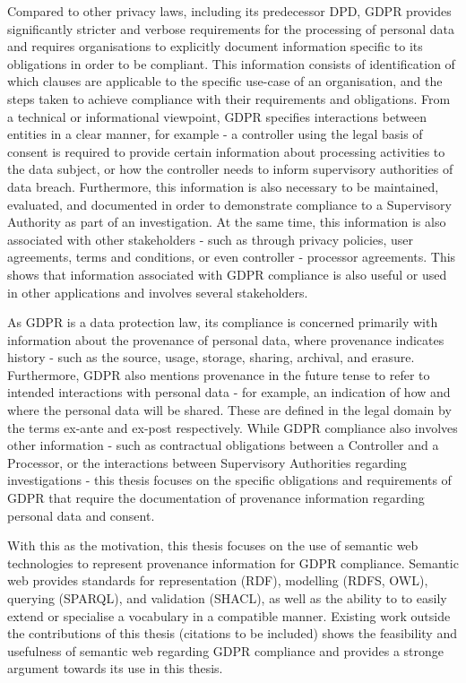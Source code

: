 Compared to other privacy laws, including its predecessor DPD, GDPR provides significantly stricter and verbose requirements for the processing of personal data and requires organisations to explicitly document information specific to its obligations in order to be compliant.
This information consists of identification of which clauses are applicable to the specific use-case of an organisation, and the steps taken to achieve compliance with their requirements and obligations.
From a technical or informational viewpoint, GDPR specifies interactions between entities in a clear manner, for example - a controller using the legal basis of consent is required to provide certain information about processing activities to the data subject, or how the controller needs to inform supervisory authorities of data breach. Furthermore, this information is also necessary to be maintained, evaluated, and documented in order to demonstrate compliance to a Supervisory Authority as part of an investigation. At the same time, this information is also associated with other stakeholders - such as through privacy policies, user agreements, terms and conditions, or even controller - processor agreements. This shows that information associated with GDPR compliance is also useful or used in other applications and involves several stakeholders.

As GDPR is a data protection law, its compliance is concerned primarily with information about the provenance of personal data, where provenance indicates history - such as the source, usage, storage, sharing, archival, and erasure. Furthermore, GDPR also mentions provenance in the future tense to refer to intended interactions with personal data - for example, an indication of how and where the personal data will be shared. These are defined in the legal domain by the terms ex-ante and ex-post respectively.
While GDPR compliance also involves other information - such as contractual obligations between a Controller and a Processor, or the interactions between Supervisory Authorities regarding investigations - this thesis focuses on the specific obligations and requirements of GDPR that require the documentation of provenance information regarding personal data and consent.



With this as the motivation, this thesis focuses on the use of semantic web technologies to represent provenance information for GDPR compliance. Semantic web provides standards for representation (RDF), modelling (RDFS, OWL), querying (SPARQL), and validation (SHACL), as well as the ability to to easily extend or specialise a vocabulary in a compatible manner. Existing work outside the contributions of this thesis (citations to be included) shows the feasibility and usefulness of semantic web regarding GDPR compliance and provides a stronge argument towards its use in this thesis.

